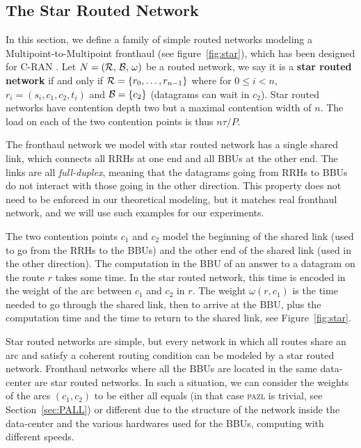 \documentclass[a4paper,10pt]{journal}
\newcommand\pazl{\textsc{pazl}\xspace}
\begin{document}
    \subsection{The Star Routed Network} \label{sec:star_routed_network}
  
	In this section, we define a family of simple routed networks modeling a Multipoint-to-Multipoint fronthaul (see figure~\ref{fig:star}), which has been designed for C-RAN \cite{tayq2017real}. Let $N = (\cal{R},\,\cal{B},\,\omega)$ be a routed network, we say it is a \textbf{star routed network} if and only if ${\cal R} =\{r_0,\dots,r_{n-1}\}$ where for $0 \leq i<n$, $r_i = (s_i,c_1,c_2,t_i)$ and ${\cal B} = \{ c_2 \}$ (datagrams can wait in $c_2$). Star routed networks have contention depth two but a maximal contention width of $n$. The load on each of the two contention points is thus $n\tau / P$.

	The fronthaul network we model with star routed network has a single shared link, which connects all RRHs at one end and all BBUs at the other end. The links are all \emph{full-duplex}, meaning that the datagrams going from RRHs to BBUs do not interact with those going in the other direction. 
	 This property does not need to be enforced in our theoretical modeling, but it matches real fronthaul network, and we will use such examples for our experiments. 
	 
	The two contention points $c_1$ and $c_2$ model the beginning of the shared link (used to go from the RRHs to the BBUs) and the other end of the shared link (used in the other direction). 
	The computation in the BBU of an answer to a datagram on the route $r$ takes some time.
	In the star routed network, this time is encoded in the weight of the arc between $c_1$ and $c_2$ in $r$. The weight $\omega(r,c_1)$ is the time needed to go through the shared link, then to arrive at the BBU, plus the computation time and the time to return to the shared link, see Figure~\ref{fig:star}.

	Star routed networks are simple, but every network in which all routes share an arc and satisfy a coherent routing condition can be modeled by a star routed network.
	Fronthaul networks where all the BBUs are located in the same data-center are star routed networks. In such a situation, we can consider the weights of the arcs $(c_1,c_2)$ to be either all equals (in that case \pazl is trivial, see Section~\ref{sec:PALL}) or different due to the structure of the network inside the data-center and the various hardwares used for the BBUs, computing with different speeds. 
\end{document}
